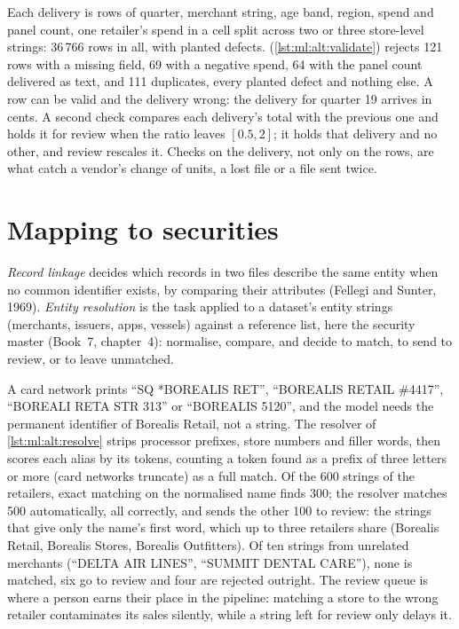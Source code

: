 Each delivery is rows of quarter, merchant string, age band, region, spend and panel count, one retailer's spend in a cell
split across two or three store-level strings: 36\,766 rows in all, with planted defects. 
(\cref{lst:ml:alt:validate}) rejects 121 rows with a missing field, 69 with a negative spend, 64 with the panel count
delivered as text, and 111 duplicates, every planted defect and nothing else. A row can be valid and the delivery wrong: the
delivery for quarter 19 arrives in cents. A second check compares each delivery's total with the previous one and holds it
for review when the ratio leaves $[0.5, 2]$; it holds that delivery and no other, and review rescales it. Checks on the
delivery, not only on the rows, are what catch a vendor's change of units, a lost file or a file sent twice.

\section{Mapping to securities}

\begin{definition}\label{def:ml:alternative-data-pipelines:er}
\emph{Record linkage} decides which records in two files describe the same entity when no common
identifier exists, by comparing their attributes (Fellegi and Sunter, 1969). \emph{Entity resolution} is the task applied to a dataset's entity strings (merchants, issuers, apps, vessels) against a reference list,
here the security master (Book~7, chapter~4): normalise, compare, and decide to match, to send to review, or to leave
unmatched.
\end{definition}

A card network prints ``SQ *BOREALIS RET'', ``BOREALIS RETAIL \#4417'', ``BOREALI RETA STR 313'' or ``BOREALIS 5120'', and
the model needs the permanent identifier of Borealis Retail, not a string. The resolver of \cref{lst:ml:alt:resolve}
strips processor prefixes, store numbers and filler words, then scores each alias by its tokens, counting a token found as a
prefix of three letters or more (card networks truncate) as a full match. Of the 600 strings of the retailers, exact matching
on the normalised name finds 300; the resolver matches 500 automatically, all correctly, and sends the other 100 to review:
the strings that give only the name's first word, which up to three retailers share (Borealis Retail, Borealis Stores,
Borealis Outfitters). Of ten strings from unrelated merchants (``DELTA AIR LINES'', ``SUMMIT DENTAL CARE''), none is matched,
six go to review and four are rejected outright. The review queue is where a person earns their place in the pipeline:
matching a store to the wrong retailer contaminates its sales silently, while a string left for review only delays it.

